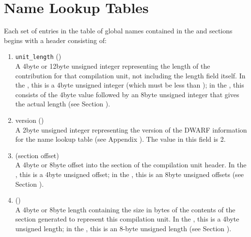 \section{Name Lookup Tables}
\label{datarep:namelookuptables}

Each set of entries in the table of global names contained
in the \dotdebugpubnames{} and 
\dotdebugpubtypes{} sections begins
with a header consisting of:
\begin{enumerate}[1. ]

\item \texttt{unit\_length} () \\
A 4\dash byte or 12\dash byte unsigned integer 
representing the length
of the \dotdebuginfo{}
contribution for that compilation unit,
not including the length field itself. In the 
\thirtytwobitdwarfformat, this is a 4\dash byte unsigned integer (which must be less
than \xfffffffzero); in the \sixtyfourbitdwarfformat, this consists
of the 4\dash byte value \wffffffff followed by an 8\dash byte unsigned
integer that gives the actual length
(see Section ).

\item  version () \\
A 2\dash byte unsigned integer representing the version of the
DWARF information for the name lookup table
(see Appendix ).
The value in this field is 2.

\item {} (section offset) \\
A 
4\dash byte or 8\dash byte 
offset into the 
\dotdebuginfo{}
section of the compilation unit header.
In the \thirtytwobitdwarfformat, this is a 4\dash byte unsigned offset;
in the \sixtyfourbitdwarfformat, this is an 8\dash byte unsigned offsets
(see Section ).

\item  {} () \\
A 
4\dash byte or 8\dash byte length containing the size in bytes of the
contents of the \dotdebuginfo{}
section generated to represent
this compilation unit. In the \thirtytwobitdwarfformat, this is
a 4\dash byte unsigned length; in the \sixtyfourbitdwarfformat, this
is an 8-byte unsigned length 
(see Section ).


\end{enumerate}

